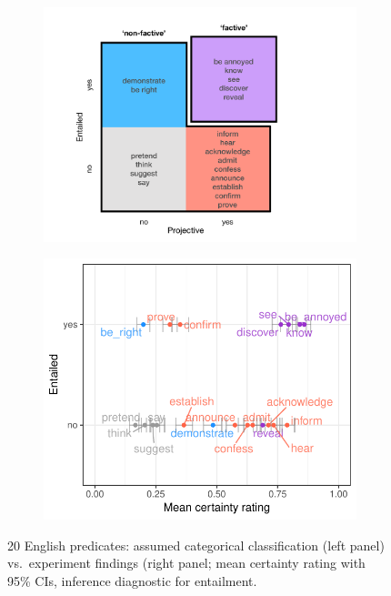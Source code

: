 \documentclass[12pt,fleqn]{article}
\newcommand{\6}{\mbox{$[\hspace*{-.6mm}[$}}
\newcommand{\9}{\mbox{$]\hspace*{-.6mm}]$}}
\begin{document}
\begin{figure}
\begin{subfigure}{.35\textwidth}
\centering
\includegraphics[trim={3.5cm 1cm 7cm 2cm},clip,width=.27\paperwidth]{../paper/figures/categorization}
\end{subfigure} %
\begin{subfigure}{.3\textwidth}
\centering
\includegraphics[width=.3\paperwidth]{../results/5-projectivity-no-fact/graphs/projection-by-inferenceEntailment}
\end{subfigure}

\caption{20 English predicates: assumed categorical classification (left panel) vs.\ experiment findings (right panel; mean certainty rating with 95\% CIs, inference diagnostic for entailment.}\label{f-summary-categorical}

\end{figure}
\end{document}
